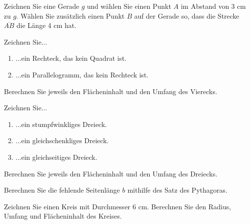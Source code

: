 \documentclass[11pt, a4paper, oneside]{article}
\begin{document}
	
	Zeichnen Sie eine Gerade $g$ und wählen Sie einen Punkt $A$ im Abstand von 3 cm zu $g$.
	Wählen Sie zusätzlich einen Punkt $B$ auf der Gerade so, dass die Strecke $\overline{AB}$ die Länge 4 cm hat.
	
	\checkered[9cm]
	
	
	Zeichnen Sie...
	\begin{enumerate}[label=\alph*)]
		\item ...ein Rechteck, das kein Quadrat ist.
		\item ...ein Parallelogramm, das kein Rechteck ist.
	\end{enumerate}
	Berechnen Sie jeweils den Flächeninhalt und den Umfang des Vierecks.
	
	\checkered[5.5cm]
	
	
	Zeichnen Sie...
	\begin{enumerate}[label=\alph*)]
		\item ...ein stumpfwinkliges Dreieck.
		\item ...ein gleichschenkliges Dreieck.
		\item ...ein gleichseitiges Dreieck.
	\end{enumerate}
	Berechnen Sie jeweils den Flächeninhalt und den Umfang des Dreiecks.
	
	\checkered[5.5cm]
	
	
	Berechnen Sie die fehlende Seitenlänge $b$ mithilfe des Satz des Pythagoras.
	
	\begin{figure}[H]
		\centering
	\end{figure}
	
	\checkered[4.5cm]
	
	
	Zeichnen Sie einen Kreis mit Durchmesser 6 cm.
	Berechnen Sie den Radius, Umfang und Flächeninhalt des Kreises.
	
	\checkered[7cm]
\end{document}
